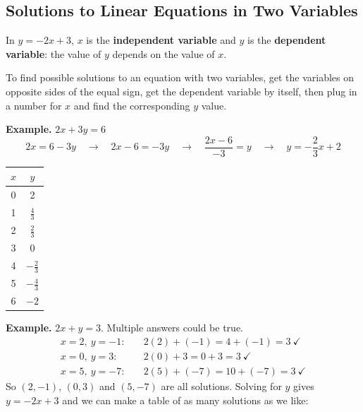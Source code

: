 \documentclass[letter]{article}
\newenvironment{keybox}
  {\begin{lrbox}{\keyboxsave}\begin{minipage}{\dimexpr\linewidth-2\fboxsep-2\fboxrule\relax}}
  {\end{minipage}\end{lrbox}\par\noindent\fbox{\usebox{\keyboxsave}}\par}
\begin{document}
\begin{center}
\end{center}

\subsection{Solutions to Linear Equations in Two Variables}

\begin{keybox}
In $y=-2x+3$, $x$ is the \textbf{independent variable} and $y$ is the \textbf{dependent variable}: the value of $y$ depends on the value of $x$.
\end{keybox}

To find possible solutions to an equation with two variables, get the variables on opposite sides of the equal sign, get the dependent variable by itself, then plug in a number for $x$ and find the corresponding $y$ value.

\textbf{Example.} $2x+3y=6$
\[2x=6-3y\quad\to\quad2x-6=-3y\quad\to\quad\frac{2x-6}{-3}=y\quad\to\quad y=-\frac23x+2\]

\begin{center}
\begin{tabular}{c|c}
$x$ & $y$\\\hline
0 & 2\\
1 & $\frac43$\\
2 & $\frac23$\\
3 & 0\\
4 & $-\frac23$\\
5 & $-\frac43$\\
6 & $-2$
\end{tabular}
\end{center}

\textbf{Example.} $2x+y=3$. Multiple answers could be true.
\begin{align*}
  x=2,\ y=-1:&\quad2(2)+(-1)=4+(-1)=3\ \checkmark\\
  x=0,\ y=3:&\quad2(0)+3=0+3=3\ \checkmark\\
  x=5,\ y=-7:&\quad2(5)+(-7)=10+(-7)=3\ \checkmark
\end{align*}
So $(2,-1)$, $(0,3)$ and $(5,-7)$ are all solutions. Solving for $y$ gives $y=-2x+3$ and we can make a table of as many solutions as we like:
\end{document}
